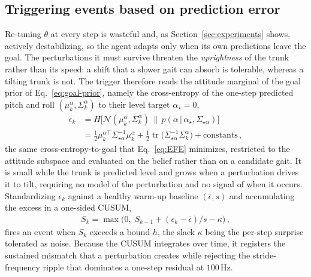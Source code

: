 \documentclass[letterpaper, 10 pt, conference]{ieeeconf}  %
\DeclareMathOperator{\tr}{tr}
\newcommand{\cN}{\mathcal{N}}
\newcommand{\given}[1][]{\,#1\vert\,}
\begin{document}
\subsection{Triggering events based on prediction error}
\label{sec:trigger}

Re-tuning $\theta$ at every step is wasteful and, as Section~\ref{sec:experiments} shows, actively destabilizing, so the agent adapts only when its own predictions leave the goal.
The perturbations it must survive threaten the \emph{uprightness} of the trunk rather than its speed: a shift that a slower gait can absorb is tolerable, whereas a tilting trunk is not.
The trigger therefore reads the attitude marginal of the goal prior of Eq.~\ref{eq:goal-prior}, namely the cross-entropy of the one-step predicted pitch and roll $(\mu_k^{\alpha}, \Sigma_k^{\alpha})$ to their level target $\alpha_{\star} = 0$,
\begin{align} \label{eq:trigger-err}
    \epsilon_k &= H\big[\cN(\mu_k^{\alpha}, \Sigma_k^{\alpha})\,\|\,p(\alpha \given \alpha_{\star}, \Sigma_{\star\alpha})\big] \\
    &= \tfrac{1}{2}\mu_k^{\alpha\top}\Sigma_{\star\alpha}^{-1}\mu_k^{\alpha} + \tfrac{1}{2}\tr \big(\Sigma_{\star\alpha}^{-1}\Sigma_k^{\alpha}\big) + \text{constants} \,, \nonumber
\end{align}
the same cross-entropy-to-goal that Eq.~\ref{eq:EFE} minimizes, restricted to the attitude subspace and evaluated on the belief rather than on a candidate gait.
It is small while the trunk is predicted level and grows when a perturbation drives it to tilt, requiring no model of the perturbation and no signal of when it occurs.
Standardizing $\epsilon_k$ against a healthy warm-up baseline $(\bar{\epsilon}, s)$ and accumulating the excess in a one-sided CUSUM,
\begin{align} \label{eq:trigger-cusum}
    S_k = \max\big(0,\; S_{k-1} + (\epsilon_k - \bar{\epsilon})/s - \kappa \big) \,,
\end{align}
fires an event when $S_k$ exceeds a bound $h$, the slack $\kappa$ being the per-step surprise tolerated as noise.
Because the CUSUM integrates over time, it registers the sustained mismatch that a perturbation creates while rejecting the stride-frequency ripple that dominates a one-step residual at $100$\,Hz.
\end{document}
